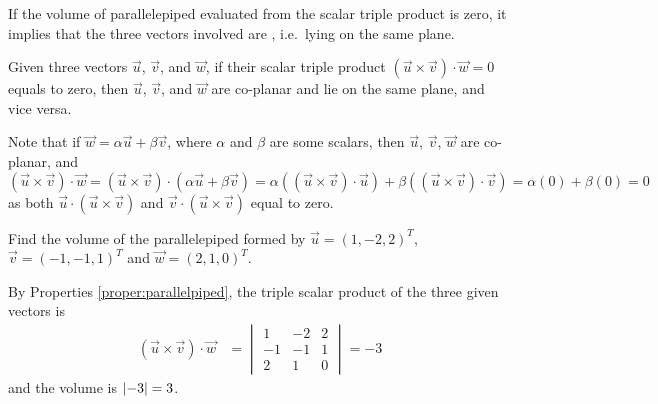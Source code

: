 If the volume of parallelepiped evaluated from the scalar triple product is zero, it implies that the three vectors involved are , i.e.\ lying on the same plane.
\begin{proper}
Given three vectors $\vec{u}$, $\vec{v}$, and $\vec{w}$, if their scalar triple product $(\vec{u} \times \vec{v}) \cdot \vec{w} = 0$ equals to zero, then $\vec{u}$, $\vec{v}$, and $\vec{w}$ are co-planar and lie on the same plane, and vice versa.
\end{proper}
Note that if $\vec{w} = \alpha \vec{u} + \beta \vec{v}$, where $\alpha$ and $\beta$ are some scalars, then $\vec{u}$, $\vec{v}$, $\vec{w}$ are co-planar, and $(\vec{u} \times \vec{v}) \cdot \vec{w} = (\vec{u} \times \vec{v}) \cdot (\alpha \vec{u} + \beta \vec{v}) = \alpha ((\vec{u} \times \vec{v}) \cdot \vec{u}) + \beta ((\vec{u} \times \vec{v}) \cdot \vec{v}) = \alpha(0) + \beta(0) = 0$ as both $\vec{u} \cdot (\vec{u} \times \vec{v})$ and $\vec{v} \cdot (\vec{u} \times \vec{v})$ equal to zero.

\begin{exmp}
Find the volume of the parallelepiped formed by $\vec{u} = (1,-2,2)^T$, $\vec{v}=(-1,-1,1)^T$ and $\vec{w}=(2,1,0)^T$.
\end{exmp}
\begin{solution}
By Properties \ref{proper:parallelpiped}, the triple scalar product of the three given vectors is
\begin{align*}
(\vec{u} \times \vec{v}) \cdot \vec{w} &=
\begin{vmatrix}
1 & -2 & 2 \\
-1 & -1 & 1 \\
2 & 1 & 0
\end{vmatrix}
= -3
\end{align*}
and the volume is $\abs{-3} = 3$.
\end{solution}

